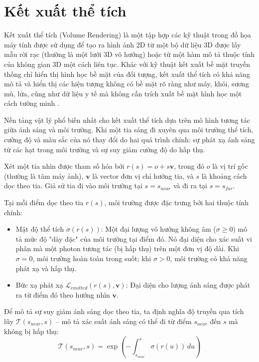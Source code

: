 \section{Kết xuất thể tích}
\label{subsec:volume_rendering_detailed}

Kết xuất thể tích (Volume Rendering) là một tập hợp các kỹ thuật trong đồ họa máy tính được sử dụng để tạo ra hình ảnh 2D từ một bộ dữ liệu 3D được lấy mẫu rời rạc (thường là một lưới 3D vô hướng) hoặc từ một hàm mô tả thuộc tính của không gian 3D một cách liên tục. Khác với kỹ thuật kết xuất bề mặt truyền thống chỉ hiển thị hình học bề mặt của đối tượng, kết xuất thể tích có khả năng mô tả và hiển thị các hiện tượng không có bề mặt rõ ràng như mây, khói, sương mù, lửa, cũng như dữ liệu y tế mà không cần trích xuất bề mặt hình học một cách tường minh \cite{Kajiya84Ray}.

Nền tảng vật lý phổ biến nhất cho kết xuất thể tích dựa trên mô hình tương tác giữa ánh sáng và môi trường. Khi một tia sáng đi xuyên qua môi trường thể tích, cường độ và màu sắc của nó thay đổi do hai quá trình chính: sự phát xạ ánh sáng từ các hạt trong môi trường và sự suy giảm cường độ do hấp thụ. 

Xét một tia nhìn được tham số hóa bởi $r(s) = o + s\mathbf{v}$, trong đó $o$ là vị trí gốc (thường là tâm máy ảnh), $\mathbf{v}$ là vector đơn vị chỉ hướng tia, và $s$ là khoảng cách dọc theo tia. Giả sử tia đi vào môi trường tại $s = s_{near}$ và đi ra tại $s = s_{far}$.

Tại mỗi điểm dọc theo tia $r(s)$, môi trường được đặc trưng bởi hai thuộc tính chính:
\begin{itemize}
    \item Mật độ thể tích $\sigma(r(s))$: Một đại lượng vô hướng không âm ($\sigma \ge 0$) mô tả mức độ "dày đặc" của môi trường tại điểm đó. Nó đại diện cho xác suất vi phân mà một photon tương tác (bị hấp thụ) trên một đơn vị độ dài. Khi $\sigma = 0$, môi trường hoàn toàn trong suốt; khi $\sigma > 0$, môi trường có khả năng phát xạ và hấp thụ.
    \item Bức xạ phát xạ $\mathcal{L}_{emitted}(r(s), \mathbf{v})$: Đại diện cho lượng ánh sáng được phát ra từ điểm đó theo hướng nhìn $\mathbf{v}$.
\end{itemize}

Để mô tả sự suy giảm ánh sáng dọc theo tia, ta định nghĩa độ truyền qua tích lũy $\mathcal{T}(s_{near}, s)$ – mô tả xác suất ánh sáng có thể đi từ điểm $s_{near}$ đến $s$ mà không bị hấp thụ:
\begin{equation} \label{eq:transmittance_cont}
\mathcal{T}(s_{near}, s) = \exp\left(-\int_{s_{near}}^{s} \sigma(r(u)) \, du\right)
\end{equation}

